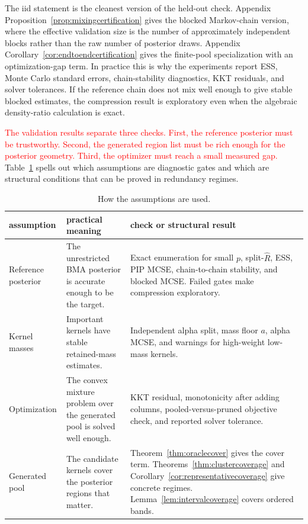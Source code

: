 \documentclass[twoside,11pt]{article}
\newcommand{\rev}[1]{\textcolor{red}{#1}}
\begin{document}
The iid statement is the cleanest version of the held-out check. Appendix Proposition~\ref{prop:mixingcertification} gives the blocked Markov-chain version, where the effective validation size is the number of approximately independent blocks rather than the raw number of posterior draws. Appendix Corollary~\ref{cor:endtoendcertification} gives the finite-pool specialization with an optimization-gap term. In practice this is why the experiments report ESS, Monte Carlo standard errors, chain-stability diagnostics, KKT residuals, and solver tolerances. If the reference chain does not mix well enough to give stable blocked estimates, the compression result is exploratory even when the algebraic density-ratio calculation is exact.

\rev{The validation results separate three checks. First, the reference posterior must be trustworthy. Second, the generated region list must be rich enough for the posterior geometry. Third, the optimizer must reach a small measured gap.} Table~\ref{tab:assumptiondiagnostics} spells out which assumptions are diagnostic gates and which are structural conditions that can be proved in redundancy regimes.

\begin{table}[!tbp]
\centering
\footnotesize
\setlength{\tabcolsep}{4pt}
\begin{tabularx}{\textwidth}{@{}>{\raggedright\arraybackslash}m{}
>{\raggedright\arraybackslash}m{}
>{\raggedright\arraybackslash}X@{}}
\toprule
assumption & practical meaning & check or structural result \\
\midrule
Reference posterior & The unrestricted BMA posterior is accurate enough to be the target. & Exact enumeration for small \(p\), split-\(\widehat R\), ESS, PIP MCSE, chain-to-chain stability, and blocked MCSE. Failed gates make compression exploratory. \\
Kernel masses & Important kernels have stable retained-mass estimates. & Independent alpha split, mass floor \(a\), alpha MCSE, and warnings for high-weight low-mass kernels. \\
Optimization & The convex mixture problem over the generated pool is solved well enough. & KKT residual, monotonicity after adding columns, pooled-versus-pruned objective check, and reported solver tolerance. \\
Generated pool & The candidate kernels cover the posterior regions that matter. & Theorem~\ref{thm:oraclecover} gives the cover term. Theorems~\ref{thm:clustercoverage} and Corollary~\ref{cor:representativecoverage} give concrete regimes. Lemma~\ref{lem:intervalcoverage} covers ordered bands. \\
\bottomrule
\end{tabularx}
\caption{How the assumptions are used.}
\label{tab:assumptiondiagnostics}
\end{table}
\end{document}
